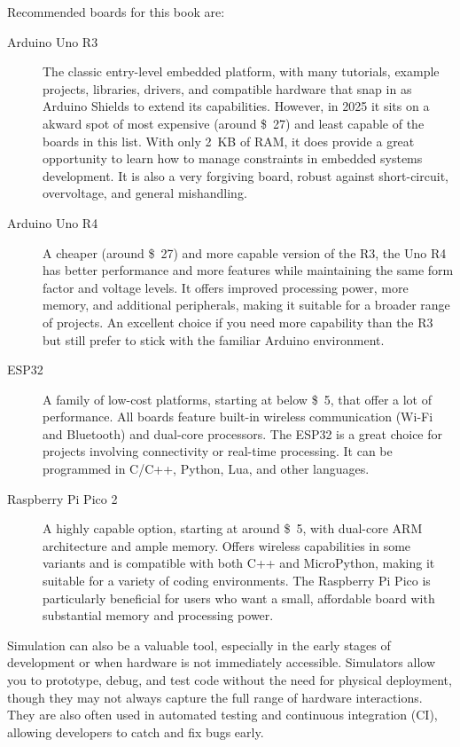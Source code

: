 Recommended boards for this book are:
\begin{description}
\item[Arduino Uno R3]
  The classic entry-level embedded platform, with many tutorials, example projects, libraries, drivers, and compatible hardware that snap in as Arduino Shields to extend its capabilities.
  However, in 2025 it sits on a akward spot of most expensive (around \SI{27}[\$]{}) and least capable of the boards in this list.
  With only \SI{2}{KB} of RAM, it does provide a great opportunity to learn how to manage constraints in embedded systems development.
  It is also a very forgiving board, robust against short-circuit, overvoltage, and general mishandling.
\item[Arduino Uno R4]
  A cheaper (around \SI{27}[\$]{}) and more capable version of the R3, the Uno R4 has better performance and more features while maintaining the same form factor and voltage levels.
  It offers improved processing power, more memory, and additional peripherals, making it suitable for a broader range of projects.
  An excellent choice if you need more capability than the R3 but still prefer to stick with the familiar Arduino environment.
\item[ESP32]
  A family of low-cost platforms, starting at below \SI{5}[\$]{}, that offer a lot of performance.
  All boards feature built-in wireless communication (Wi-Fi and Bluetooth) and dual-core processors.
  The ESP32 is a great choice for projects involving connectivity or real-time processing.
  It can be programmed in C/C++, Python, Lua, and other languages.
\item[Raspberry Pi Pico 2]
  A highly capable option, starting at around \SI{5}[\$]{}, with dual-core ARM architecture and ample memory.
  Offers wireless capabilities in some variants and is compatible with both C++ and MicroPython, making it suitable for a variety of coding environments.
  The Raspberry Pi Pico is particularly beneficial for users who want a small, affordable board with substantial memory and processing power.
\end{description}

Simulation can also be a valuable tool, especially in the early stages of development or when hardware is not immediately accessible.
Simulators allow you to prototype, debug, and test code without the need for physical deployment, though they may not always capture the full range of hardware interactions.
They are also often used in automated testing and continuous integration (CI), allowing developers to catch and fix bugs early.


